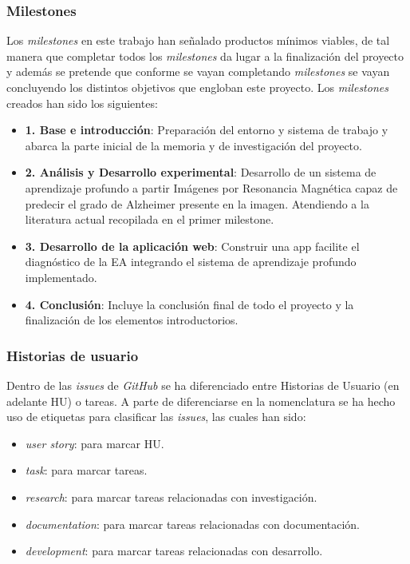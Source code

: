 \subsubsection{Milestones}
Los \textit{milestones} en este trabajo han señalado productos mínimos viables, de tal manera que completar todos los
\textit{milestones} da lugar a la finalización del proyecto y además se pretende que conforme se vayan completando
\textit{milestones} se vayan concluyendo los distintos objetivos que engloban este proyecto.
Los \textit{milestones} creados han sido los siguientes:
\begin{itemize}
    \item  \textbf{1. Base e introducción}: Preparación del entorno y sistema de trabajo y abarca la parte inicial de la
    memoria y de investigación del proyecto.
    \item \textbf{2. Análisis y Desarrollo experimental}: Desarrollo de un sistema de aprendizaje profundo a partir
    Imágenes por Resonancia Magnética capaz de predecir el grado de Alzheimer presente en la imagen.
    Atendiendo a la literatura actual recopilada en el primer milestone.
    \item \textbf{3. Desarrollo de la aplicación web}: Construir una app facilite  el diagnóstico de la EA integrando el
    sistema de aprendizaje profundo implementado.
    \item \textbf{4. Conclusión}: Incluye la conclusión final de todo el proyecto y la finalización de los elementos
    introductorios.\\
\end{itemize}

\subsubsection{Historias de usuario}
Dentro de las \textit{issues} de \textit{GitHub} se ha diferenciado entre Historias de Usuario (en adelante HU) o
tareas.
A parte de diferenciarse en la nomenclatura se ha hecho uso de etiquetas para clasificar las \textit{issues}, las cuales
han sido:

\begin{itemize}
    \item \textit{user story}: para marcar HU.
    \item \textit{task}: para marcar tareas.
    \item \textit{research}: para marcar tareas relacionadas con investigación.
    \item \textit{documentation}: para marcar tareas relacionadas con documentación.
    \item \textit{development}: para marcar tareas relacionadas con desarrollo. \\
\end{itemize}

